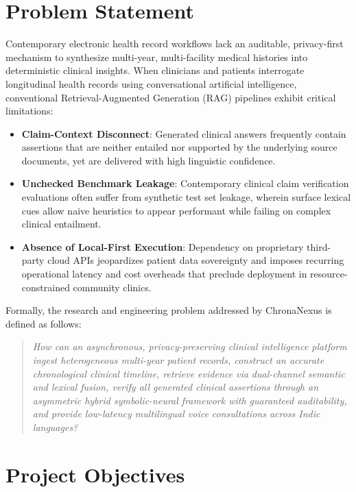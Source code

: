 \section{Problem Statement}
\label{sec:intro_problem}

Contemporary electronic health record workflows lack an auditable, privacy-first mechanism to synthesize multi-year, multi-facility medical histories into deterministic clinical insights. When clinicians and patients interrogate longitudinal health records using conversational artificial intelligence, conventional Retrieval-Augmented Generation (RAG) pipelines exhibit critical limitations:
\begin{itemize}
    \item \textbf{Claim-Context Disconnect}: Generated clinical answers frequently contain assertions that are neither entailed nor supported by the underlying source documents, yet are delivered with high linguistic confidence.
    \item \textbf{Unchecked Benchmark Leakage}: Contemporary clinical claim verification evaluations often suffer from synthetic test set leakage, wherein surface lexical cues allow naive heuristics to appear performant while failing on complex clinical entailment.
    \item \textbf{Absence of Local-First Execution}: Dependency on proprietary third-party cloud APIs jeopardizes patient data sovereignty and imposes recurring operational latency and cost overheads that preclude deployment in resource-constrained community clinics.
\end{itemize}

Formally, the research and engineering problem addressed by ChronaNexus is defined as follows:
\begin{quote}
\textit{How can an asynchronous, privacy-preserving clinical intelligence platform ingest heterogeneous multi-year patient records, construct an accurate chronological clinical timeline, retrieve evidence via dual-channel semantic and lexical fusion, verify all generated clinical assertions through an asymmetric hybrid symbolic-neural framework with guaranteed auditability, and provide low-latency multilingual voice consultations across Indic languages?}
\end{quote}


\section{Project Objectives}
\label{sec:intro_objectives}

